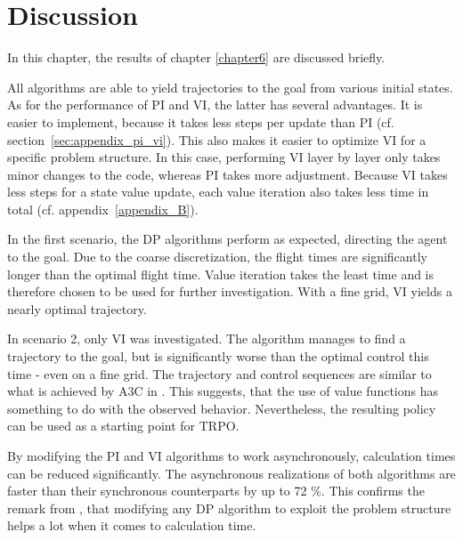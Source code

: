 \chapter{Discussion}
\label{chapter7}
In this chapter, the results of chapter \ref{chapter6} are discussed briefly.

All algorithms are able to yield trajectories to the goal from various initial states. As for the performance of PI and VI, the latter has several advantages. It is easier to implement, because it takes less steps per update than PI (cf. section~\ref{sec:appendix_pi_vi}). This also makes it easier to optimize VI for a specific problem structure. In this case, performing VI layer by layer only takes minor changes to the code, whereas PI takes more adjustment. Because VI takes less steps for a state value update, each value iteration also takes less time in total (cf. appendix~\ref{appendix_B}).

In the first scenario, the DP algorithms perform as expected, directing the agent to the goal. Due to the coarse discretization, the flight times are significantly longer than the optimal flight time. Value iteration takes the least time and is therefore chosen to be used for further investigation. With a fine grid, VI yields a nearly optimal trajectory.

In scenario 2, only VI was investigated. The algorithm manages to find a trajectory to the goal, but is significantly worse than the optimal control this time - even on a fine grid. The trajectory and control sequences are similar to what is achieved by A3C in \cite{Zuern2017}. This suggests, that the use of value functions has something to do with the observed behavior. Nevertheless, the resulting policy can be used as a starting point for TRPO.

By modifying the PI and VI algorithms to work asynchronously, calculation times can be reduced significantly. The asynchronous realizations of both algorithms are faster than their synchronous counterparts by up to 72 \%. This confirms the remark from \cite{Powell2007ADP}, that modifying any DP algorithm to exploit the problem structure helps a lot when it comes to calculation time.

